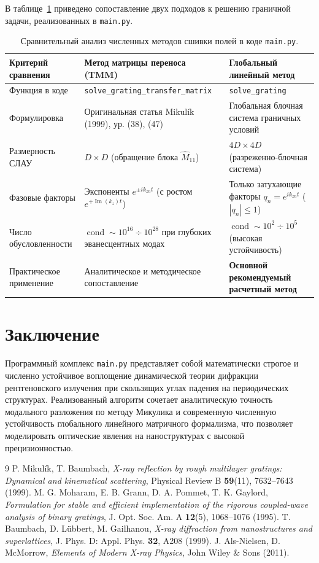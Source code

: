 \documentclass[a4paper,11pt]{article}
\begin{document}
В таблице~\ref{tab:comparison_solvers} приведено сопоставление двух подходов к решению граничной задачи, реализованных в \texttt{main.py}.

\begin{table}[htbp]
\centering
\small
\begin{tabularx}{\textwidth}{lXX}
\toprule
\textbf{Критерий сравнения} & \textbf{Метод матрицы переноса (TMM)} & \textbf{Глобальный линейный метод} \\
\midrule
Функция в коде & \texttt{solve\_grating\_transfer\_matrix} & \texttt{solve\_grating} \\
Формулировка & Оригинальная статья Mikulík (1999), ур. (38), (47) & Глобальная блочная система граничных условий \\
Размерность СЛАУ & $D \times D$ (обращение блока $\hat{M}_{11}$) & $4D \times 4D$ (разреженно-блочная система) \\
Фазовые факторы & Экспоненты $e^{\pm i k_{zn} t}$ (с ростом $e^{+\operatorname{Im}(k_z)t}$) & Только затухающие факторы $q_n = e^{i k_{zn} t}$ ($|q_n| \le 1$) \\
Число обусловленности & $\operatorname{cond} \sim 10^{16} \div 10^{28}$ при глубоких эванесцентных модах & $\operatorname{cond} \sim 10^2 \div 10^5$ (высокая устойчивость) \\
Практическое применение & Аналитическое и методическое сопоставление & \textbf{Основной рекомендуемый расчетный метод} \\
\bottomrule
\end{tabularx}
\caption{Сравнительный анализ численных методов сшивки полей в коде \texttt{main.py}.}
\label{tab:comparison_solvers}
\end{table}

\section{Заключение}
Программный комплекс \texttt{main.py} представляет собой математически строгое и численно устойчивое воплощение динамической теории дифракции рентгеновского излучения при скользящих углах падения на периодических структурах. Реализованный алгоритм сочетает аналитическую точность модального разложения по методу Микулика и современную численную устойчивость глобального линейного матричного формализма, что позволяет моделировать оптические явления на наноструктурах с высокой прецизионностью.

\begin{thebibliography}{9}
 P. Mikulík, T. Baumbach, \emph{X-ray reflection by rough multilayer gratings: Dynamical and kinematical scattering}, Physical Review B \textbf{59}(11), 7632--7643 (1999).
 M. G. Moharam, E. B. Grann, D. A. Pommet, T. K. Gaylord, \emph{Formulation for stable and efficient implementation of the rigorous coupled-wave analysis of binary gratings}, J. Opt. Soc. Am. A \textbf{12}(5), 1068--1076 (1995).
 T. Baumbach, D. Lübbert, M. Gailhanou, \emph{X-ray diffraction from nanostructures and superlattices}, J. Phys. D: Appl. Phys. \textbf{32}, A208 (1999).
 J. Als-Nielsen, D. McMorrow, \emph{Elements of Modern X-ray Physics}, John Wiley \& Sons (2011).
\end{thebibliography}
\end{document}
